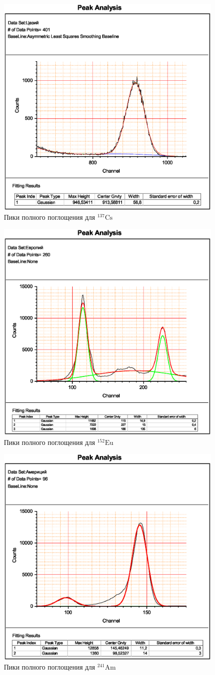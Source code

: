 \documentclass[a4paper]{article}
\newcommand{\isotope}[2]{$ ^{#2}\mathrm{#1} $}
\begin{document}
\begin{figure}
	\centering
	\includegraphics[width=0.7\linewidth]{"3"}
	\caption{Пики полного поглощения для \isotope{Cs}{137}}
	\label{fig:Cs}
\end{figure}
\begin{figure}
	\centering
	\includegraphics[width=0.7\linewidth]{"4"}
	\caption{Пики полного поглощения для \isotope{Eu}{152}}
	\label{fig:Eu}
\end{figure}
\begin{figure}
	\centering
	\includegraphics[width=0.7\linewidth]{"5"}
	\caption{Пики полного поглощения для \isotope{Am}{241}}
	\label{fig:Am}
\end{figure}
\end{document}
